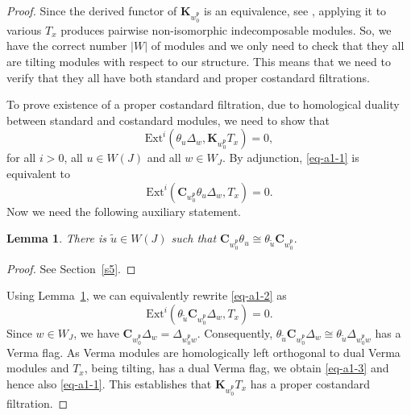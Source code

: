 \documentclass[a4paper]{amsart}
\newtheorem{lemma}[theorem]{Lemma}
\begin{document}
\begin{proof}
Since the derived functor of $\mathbf{K}_{w_0^\mathfrak{p}}$
is an equivalence, see \cite[Theorem~5.9]{MS3}, applying it
to various $T_x$ produces pairwise non-isomorphic 
indecomposable modules. So, we have the correct number $|W|$
of modules and we only need to check that they all are
tilting modules with respect to our structure. This means
that we need to verify that they all have both standard and
proper costandard filtrations.

To prove existence of a proper costandard filtration, due to
homological duality between standard and costandard modules,
we need to show that
\begin{equation}\label{eq-a1-1}
\mathrm{Ext}^i(\theta_u\Delta_w,\mathbf{K}_{w_0^\mathfrak{p}}T_x)=0, 
\end{equation}
for all $i>0$, all $u\in W(J)$ and all $w\in W_J$.
By adjunction, \eqref{eq-a1-1} is equivalent to 
\begin{equation}\label{eq-a1-2}
\mathrm{Ext}^i(\mathbf{C}_{w_0^\mathfrak{p}}\theta_u\Delta_w,T_x)=0. 
\end{equation}
Now we need the following auxiliary statement.

\begin{lemma}\label{lem-tilt2-1}
There is $\tilde{u}\in W(J)$ such that 
$\mathbf{C}_{w_0^\mathfrak{p}}\theta_u\cong
\theta_{\tilde{u}}\mathbf{C}_{w_0^\mathfrak{p}}.$
\end{lemma}

\begin{proof}
See Section~\ref{s5}.
\end{proof}

Using Lemma~\ref{lem-tilt2-1}, we can equivalently rewrite
\eqref{eq-a1-2} as 
\begin{equation}\label{eq-a1-3}
\mathrm{Ext}^i(\theta_{\tilde{u}}\mathbf{C}_{w_0^\mathfrak{p}}\Delta_w,T_x)=0. 
\end{equation}
Since $w\in W_J$, we have 
$\mathbf{C}_{w_0^\mathfrak{p}}\Delta_w=\Delta_{w_0^\mathfrak{p}w}$.
Consequently, $\theta_{\tilde{u}}\mathbf{C}_{w_0^\mathfrak{p}}\Delta_w
\cong \theta_{\tilde{u}}\Delta_{w_0^\mathfrak{p}w}$ has a Verma flag.
As Verma modules are homologically left orthogonal to dual Verma modules
and $T_x$, being tilting, has a dual Verma flag, we obtain
\eqref{eq-a1-3} and hence also \eqref{eq-a1-1}.
This establishes that $\mathbf{K}_{w_0^\mathfrak{p}}T_x$
has a proper costandard filtration.


\end{proof}
\end{document}
